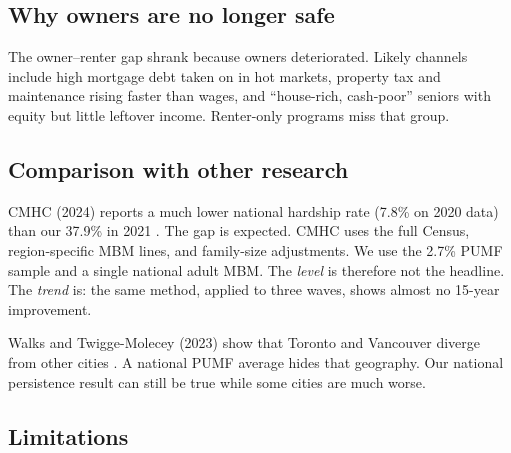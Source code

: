 \documentclass[11pt,letterpaper]{article}
\begin{document}
\subsection{Why owners are no longer safe}
\label{sec:owners}

The owner--renter gap shrank because owners deteriorated.
Likely channels include high mortgage debt taken on in hot markets, property tax and maintenance rising faster than wages, and ``house-rich, cash-poor'' seniors with equity but little leftover income.
Renter-only programs miss that group.

\subsection{Comparison with other research}
\label{sec:lit}

CMHC (2024) reports a much lower national hardship rate (7.8\% on 2020 data) than our 37.9\% in 2021 \cite{cmhc2024}.
The gap is expected.
CMHC uses the full Census, region-specific MBM lines, and family-size adjustments.
We use the 2.7\% PUMF sample and a single national adult MBM.
The \emph{level} is therefore not the headline.
The \emph{trend} is: the same method, applied to three waves, shows almost no 15-year improvement.

Walks and Twigge-Molecey (2023) show that Toronto and Vancouver diverge from other cities \cite{walks2023}.
A national PUMF average hides that geography.
Our national persistence result can still be true while some cities are much worse.

\subsection{Limitations}
\label{sec:limits}
\end{document}
